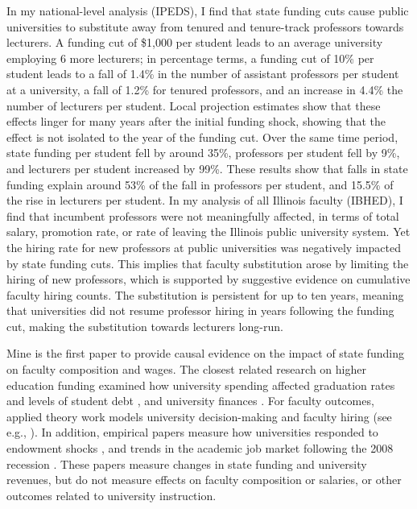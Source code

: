 In my national-level analysis (IPEDS), I find that state funding cuts cause public universities to substitute away from tenured and tenure-track professors towards lecturers.
A funding cut of \$1,000 per student leads to an average university employing 6 more lecturers;
in percentage terms, a funding cut of 10\% per student leads to a fall of 1.4\% in the number of assistant professors per student at a university, a fall of 1.2\% for tenured professors, and an increase in 4.4\% the number of lecturers per student.
Local projection estimates show that these effects linger for many years after the initial funding shock, showing that the effect is not isolated to the year of the funding cut. 
Over the same time period, state funding per student fell by around 35\%, professors per student fell by 9\%, and lecturers per student increased by 99\%.
These results show that falls in state funding explain around 53\% of the fall in professors per student,
and 15.5\% of the rise in lecturers per student.
In my analysis of all Illinois faculty (IBHED), I find that incumbent professors were not meaningfully affected, in terms of total salary, promotion rate, or rate of leaving the Illinois public university system.
Yet the hiring rate for new professors at public universities was negatively impacted by state funding cuts.
This implies that faculty substitution arose by limiting the hiring of new professors, which is supported by suggestive evidence on cumulative faculty hiring counts.
The substitution is persistent for up to ten years, meaning that universities did not resume professor hiring in years following the funding cut, making the substitution towards lecturers long-run.

Mine is the first paper to provide causal evidence on the impact of state funding on faculty composition and wages.
The closest related research on higher education funding examined how university spending affected graduation rates and levels of student debt \citep{NBERw23736,NBERw27885}, and university finances \citep{miller2022making,bound2019public,brown2014endowment}.
For faculty outcomes, applied theory work models university decision-making and faculty hiring (see e.g., \citealt{abe2015implications,johnson2009jep,NBERc13879}).
In addition, empirical papers measure how universities responded to endowment shocks \citep{brown2014endowment}, and trends in the academic job market following the 2008 recession \citep{turner2014impact}.
These papers measure changes in state funding and university revenues, but do not measure effects on faculty composition or salaries, or other outcomes related to university instruction.

